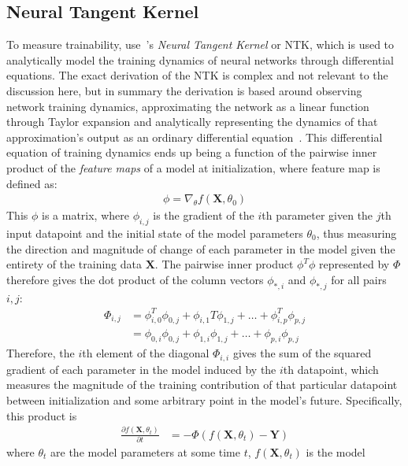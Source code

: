 \subsection{Neural Tangent Kernel}\label{sect:ntk_intro}
 To measure trainability, \citeauthor{chen2021} use~\citeauthor{jacot2018}'s
\textit{Neural Tangent Kernel} or NTK, which is used to analytically model the training dynamics of neural networks
through differential equations. The exact derivation of the NTK is complex and not relevant to the discussion here, but
in summary the derivation is based around observing network training dynamics, approximating the network as a linear
function through Taylor expansion and analytically representing the dynamics of that approximation's output as
an ordinary differential equation~\citep{dwaraknath2014}. This differential equation of training dynamics ends up being a function of
the pairwise inner product of the \textit{feature maps} of a model at initialization, where feature map is defined as:
\begin{align}
    \phi = \nabla_\theta f(\mathbf{X}, \theta_0)
\end{align}
\noindent This $\phi$ is a matrix, where $\phi_{i,j}$ is the gradient of the $i$th parameter given the $j$th input datapoint and the
initial state of the model parameters $\theta_0$, thus measuring the direction and magnitude of change of each parameter in the model
given the entirety of the training data $\mathbf{X}$. The pairwise inner product $\phi^T\phi$ represented by $\Phi$ therefore gives the dot product
of the column vectors $\phi_{*,i}$ and $\phi_{*,j}$ for all pairs $i, j$:
\begin{align}
    \Phi_{i,j} &= \phi^T_{i,0}\phi_{0,j} + \phi_{i,1}T\phi_{1,j} + \dots + \phi_{i,p}^T\phi_{p,j} \\
               &= \phi_{0,i}\phi_{0,j}   + \phi_{1,i}\phi_{1,j}   + \dots + \phi_{p,i}\phi_{p,j}
\end{align}
\noindent Therefore, the $i$th element of the diagonal $\Phi_{i,i}$ gives the sum of the squared gradient of each
parameter in the model induced by the $i$th datapoint, which measures the magnitude of the training contribution of that
particular datapoint between initialization and some arbitrary point in the model's future. Specifically, this product is
\begin{align}
    \frac{\partial f(\mathbf{X}, \theta_t)}{\partial t} &= -\Phi (f(\mathbf{X}, \theta_t) - \mathbf{Y})
\end{align}
\noindent where $\theta_t$ are the model parameters at some time $t$, $f(\mathbf{X}, \theta_t)$ is the model
